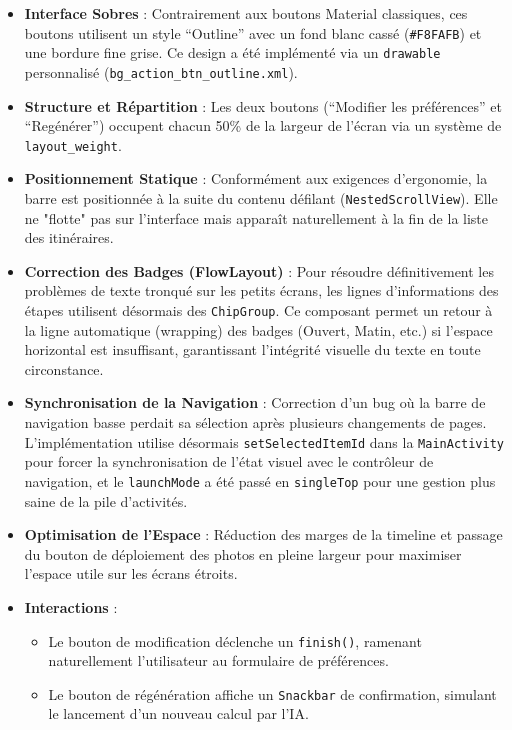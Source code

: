 \documentclass{article}
\begin{document}
\begin{itemize}
    \item \textbf{Interface Sobres} : Contrairement aux boutons Material classiques, ces boutons utilisent un style ``Outline'' avec un fond blanc cassé (\texttt{\#F8FAFB}) et une bordure fine grise. Ce design a été implémenté via un \texttt{drawable} personnalisé (\texttt{bg\_action\_btn\_outline.xml}).
    \item \textbf{Structure et Répartition} : Les deux boutons (``Modifier les préférences'' et ``Regénérer'') occupent chacun 50\% de la largeur de l'écran via un système de \texttt{layout\_weight}.
    \item \textbf{Positionnement Statique} : Conformément aux exigences d'ergonomie, la barre est positionnée à la suite du contenu défilant (\texttt{NestedScrollView}). Elle ne "flotte" pas sur l'interface mais apparaît naturellement à la fin de la liste des itinéraires.
    \item \textbf{Correction des Badges (FlowLayout)} : Pour résoudre définitivement les problèmes de texte tronqué sur les petits écrans, les lignes d'informations des étapes utilisent désormais des \texttt{ChipGroup}. Ce composant permet un retour à la ligne automatique (wrapping) des badges (Ouvert, Matin, etc.) si l'espace horizontal est insuffisant, garantissant l'intégrité visuelle du texte en toute circonstance.
    \item \textbf{Synchronisation de la Navigation} : Correction d'un bug où la barre de navigation basse perdait sa sélection après plusieurs changements de pages. L'implémentation utilise désormais \texttt{setSelectedItemId} dans la \texttt{MainActivity} pour forcer la synchronisation de l'état visuel avec le contrôleur de navigation, et le \texttt{launchMode} a été passé en \texttt{singleTop} pour une gestion plus saine de la pile d'activités.
    \item \textbf{Optimisation de l'Espace} : Réduction des marges de la timeline et passage du bouton de déploiement des photos en pleine largeur pour maximiser l'espace utile sur les écrans étroits.
    \item \textbf{Interactions} :
    \begin{itemize}
        \item Le bouton de modification déclenche un \texttt{finish()}, ramenant naturellement l'utilisateur au formulaire de préférences.
        \item Le bouton de régénération affiche un \texttt{Snackbar} de confirmation, simulant le lancement d'un nouveau calcul par l'IA.
    \end{itemize}
\end{itemize}
\end{document}
